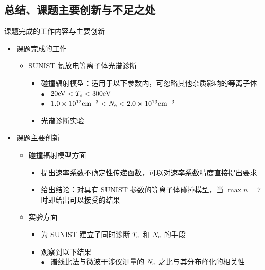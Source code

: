\begin{CJK*}{UTF8}{kai}
\section{总结、课题主要创新与不足之处}

\begin{frame}{课题完成的工作内容与主要创新}
	\begin{itemize}
		\item 课题完成的工作
			\begin{itemize}
				\item SUNIST 氦放电等离子体光谱诊断
					\begin{itemize}
						\item 碰撞辐射模型：适用于以下参数内，可忽略其他杂质影响的等离子体\\%
								{\footnotesize
								{\color{bulletcolor}\quad\tiny{}\hbox{{$\bullet$}}}~ $20{\rm eV}<T_e<300{\rm eV}$ \\
								{\color{bulletcolor}\quad\tiny{}\hbox{{$\bullet$}}}~ $1.0\times10^{12}{\rm cm}^{-3}<N_{\rm e}<2.0\times10^{13}{\rm cm}^{-3}$
								}
						\item 光谱诊断实验%
					\end{itemize}
			\end{itemize}
		\bigskip
		\item 课题主要创新
			\begin{itemize}
				\item 碰撞辐射模型方面
					\begin{itemize}
						\item 提出速率系数不确定性传递函数，可以对速率系数精度直接提出要求
						\item 给出结论：对具有 SUNIST 参数的等离子体碰撞模型，当 $\max n=7$ 时即给出可以接受的结果
					\end{itemize}
				\item 实验方面
					\begin{itemize}
						\item 为 SUNIST 建立了同时诊断 $T_{\rm e}$ 和 $N_{\rm e}$ 的手段
						\item 观察到以下结果\\
						{\footnotesize
							{\color{bulletcolor}\quad\tiny{}\hbox{{$\bullet$}}}~ 谱线比法与微波干涉仪测量的 $N_{\rm e}$ 之比与其分布峰化的相关性 \\
}
\end{itemize}
\end{itemize}
\end{itemize}
\end{frame}
\end{CJK*}
